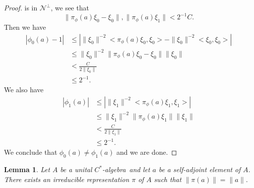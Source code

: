 \documentclass{book}
\newtheorem{lemma}[definition]{Lemma}
\def\cstar{\(C^*\)-algebra}
\begin{document}
\begin{proof}
  is in \(\mathcal{N}^\perp\), we see that
  \[\|\pi_\phi(a)\xi_0 - \xi_0\| , \|\pi_\phi(a)\xi_1\| < 2^{-1}C.\]
  Then we have
  \begin{align*}
    |\phi_0(a) - 1| &\leq | \|\xi_0\|^{-2} < \pi_\phi(a)\xi_0,\xi_0 > -\|\xi_0\|^{-2} < \xi_0,\xi_0 > |\\
    &\leq \|\xi_0\|^{-2} \|\pi_\phi(a)\xi_0-\xi_0\| \|\xi_0\|\\
    &< \frac{C}{2\|\xi_0\|}\\
    &\leq 2^{-1}.
  \end{align*}
  We also have
  \begin{align*}
    |\phi_1(a)| &\leq | \|\xi_1\|^{-2} < \pi_\phi(a)\xi_1,\xi_1 > |\\
    &\leq \|\xi_1\|^{-2} \|\pi_\phi(a)\xi_1\| \|\xi_1\|\\
    &<  \frac{C}{{2\|\xi_1\|}}\\
    &\leq 2^{-1}.
  \end{align*}
  We conclude that \(\phi_0(a)\neq \phi_1(a)\) and we are done.
\end{proof}
\begin{lemma}\label{lemma:1129}
  Let \(A\) be a unital \cstar\ and let \(a\) be a self-adjoint
  element of \(A\). There exists an irreducible representation \(\pi\) of \(A\) such that
  \(\|\pi(a)\| = \|a\| \).
\end{lemma}
\end{document}
